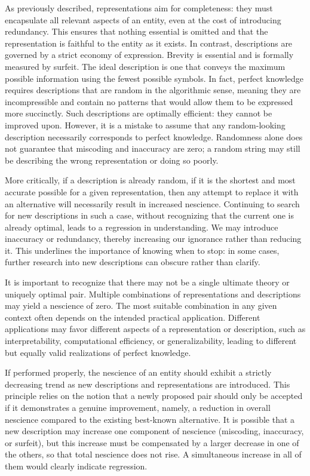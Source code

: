 As previously described, representations aim for completeness: they must encapsulate all relevant aspects of an entity, even at the cost of introducing redundancy. This ensures that nothing essential is omitted and that the representation is faithful to the entity as it exists. In contrast, descriptions are governed by a strict economy of expression. Brevity is essential and is formally measured by surfeit. The ideal description is one that conveys the maximum possible information using the fewest possible symbols. In fact, perfect knowledge requires descriptions that are random in the algorithmic sense, meaning they are incompressible and contain no patterns that would allow them to be expressed more succinctly. Such descriptions are optimally efficient: they cannot be improved upon. However, it is a mistake to assume that any random-looking description necessarily corresponds to perfect knowledge. Randomness alone does not guarantee that miscoding and inaccuracy are zero; a random string may still be describing the wrong representation or doing so poorly.

More critically, if a description is already random, if it is the shortest and most accurate possible for a given representation, then any attempt to replace it with an alternative will necessarily result in increased nescience. Continuing to search for new descriptions in such a case, without recognizing that the current one is already optimal, leads to a regression in understanding. We may introduce inaccuracy or redundancy, thereby increasing our ignorance rather than reducing it. This underlines the importance of knowing when to stop: in some cases, further research into new descriptions can obscure rather than clarify.

It is important to recognize that there may not be a single ultimate theory or uniquely optimal pair. Multiple combinations of representations and descriptions may yield a nescience of zero. The most suitable combination in any given context often depends on the intended practical application. Different applications may favor different aspects of a representation or description, such as interpretability, computational efficiency, or generalizability, leading to different but equally valid realizations of perfect knowledge.

If performed properly, the nescience of an entity should exhibit a strictly decreasing trend as new descriptions and representations are introduced. This principle relies on the notion that a newly proposed pair should only be accepted if it demonstrates a genuine improvement, namely, a reduction in overall nescience compared to the existing best-known alternative. It is possible that a new description may increase one component of nescience (miscoding, inaccuracy, or surfeit), but this increase must be compensated by a larger decrease in one of the others, so that total nescience does not rise. A simultaneous increase in all of them would clearly indicate regression.

